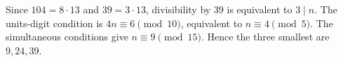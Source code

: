 Since $104=8\cdot13$ and $39=3\cdot13$, divisibility by $39$ is equivalent to $3\mid n$. The units-digit condition is $4n\equiv6\pmod{10}$, equivalent to $n\equiv4\pmod5$. The simultaneous conditions give $n\equiv9\pmod{15}$. Hence the three smallest are $\boxed{9,24,39}$.
